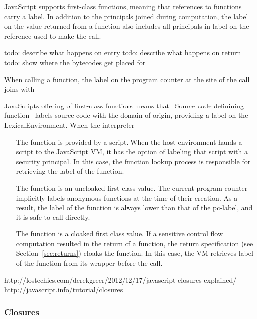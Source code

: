 JavaScript supports first-class functions, meaning that references to functions carry a label.
In addition to the principals joined during computation, the label on the value returned from a function also includes all principals in label on the reference used to make the call.

\begin{jscode}
\end{jscode}

todo: describe what happens on entry
todo: describe what happens on return
todo: show where the bytecodes get placed for 

When calling a function, the label on the program counter at the site of the call joins with 

JavaScripts offering of first-class functions means that \FlowCore\
Source code definining function
\FlowCore\ labels source code with the domain of origin, providing a label on the LexicalEnvironment.
When the interpreter

\begin{enumerate}
 \item [The function is provided by a script.]
  When the host environment hands a script to the JavaScript VM, it has the option of labeling that script with a security principal.
  In this case, the function lookup process is responsible for retrieving the label of the function.
 \item [The function is an uncloaked first class value.]
  The current program counter implicitly labels anonymous functions at the time of their creation.
  As a result, the label of the function is always lower than that of the pc-label, and it is safe to call directly.
 \item [The function is a cloaked first class value.]
  If a sensitive control flow computation resulted in the return of a function, the return specification (see Section~\ref{sec:returns}) cloaks the function.
  In this case, the VM retrieves label of the function from its wrapper before the call.
\end{enumerate}

http://lostechies.com/derekgreer/2012/02/17/javascript-closures-explained/
http://javascript.info/tutorial/closures




\subsubsection{Closures}
